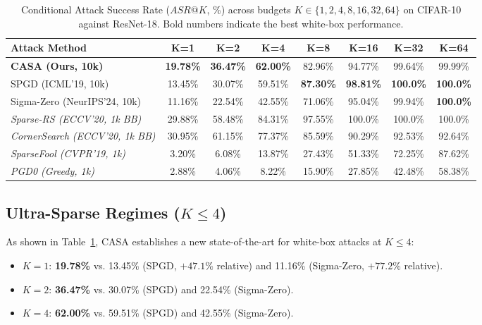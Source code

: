 \documentclass[10pt,twocolumn,letterpaper]{article}
\begin{document}
\begin{table}[t]
\centering
\small
\caption{Conditional Attack Success Rate ($ASR@K$, \%) across budgets $K \in \{1, 2, 4, 8, 16, 32, 64\}$ on CIFAR-10 against ResNet-18. Bold numbers indicate the best white-box performance.}
\label{tab:asr}
\begin{tabular}{lccccccc}
\toprule
\textbf{Attack Method} & \textbf{K=1} & \textbf{K=2} & \textbf{K=4} & \textbf{K=8} & \textbf{K=16} & \textbf{K=32} & \textbf{K=64} \\
\midrule
\textbf{CASA (Ours, 10k)} & \textbf{19.78\%} & \textbf{36.47\%} & \textbf{62.00\%} & 82.96\% & 94.77\% & 99.64\% & 99.99\% \\
SPGD (ICML'19, 10k) & 13.45\% & 30.07\% & 59.51\% & \textbf{87.30\%} & \textbf{98.81\%} & \textbf{100.0\%} & \textbf{100.0\%} \\
Sigma-Zero (NeurIPS'24, 10k) & 11.16\% & 22.54\% & 42.55\% & 71.06\% & 95.04\% & 99.94\% & \textbf{100.0\%} \\
\midrule
\textit{Sparse-RS (ECCV'20, 1k BB)} & 29.88\% & 58.48\% & 84.31\% & 97.55\% & 100.0\% & 100.0\% & 100.0\% \\
\textit{CornerSearch (ECCV'20, 1k BB)} & 30.95\% & 61.15\% & 77.37\% & 85.59\% & 90.29\% & 92.53\% & 92.64\% \\
\textit{SparseFool (CVPR'19, 1k)} & 3.20\% & 6.08\% & 13.87\% & 27.43\% & 51.33\% & 72.25\% & 87.62\% \\
\textit{PGD0 (Greedy, 1k)} & 2.88\% & 4.06\% & 8.22\% & 15.90\% & 27.85\% & 42.48\% & 58.38\% \\
\bottomrule
\end{tabular}
\end{table}

\subsection{Ultra-Sparse Regimes ($K \le 4$)}
As shown in Table~\ref{tab:asr}, CASA establishes a new state-of-the-art for white-box attacks at $K \le 4$:
\begin{itemize}
    \item $K=1$: \textbf{19.78\%} vs. 13.45\% (SPGD, $+47.1\%$ relative) and 11.16\% (Sigma-Zero, $+77.2\%$ relative).
    \item $K=2$: \textbf{36.47\%} vs. 30.07\% (SPGD) and 22.54\% (Sigma-Zero).
    \item $K=4$: \textbf{62.00\%} vs. 59.51\% (SPGD) and 42.55\% (Sigma-Zero).
\end{itemize}
\end{document}
